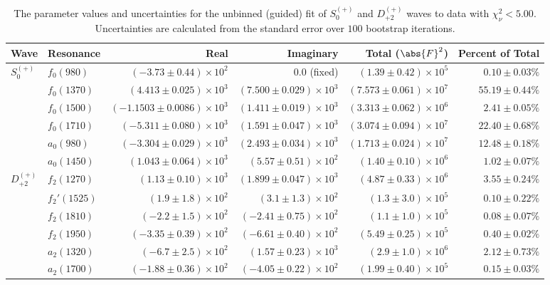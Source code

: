 \begin{table}[ht]
    \begin{center}
        \begin{tabular}{llrrrr}\toprule
        Wave & Resonance & Real & Imaginary & Total ($\abs{F}^2$) & Percent of Total \\\midrule
$S_{0}^{(+)}$ & $f_{0}(980)$ & $(-3.73 \pm 0.44) \times 10^{2}$ & $0.0$ (fixed) & $(1.39 \pm 0.42) \times 10^{5}$ & $0.10 \pm 0.03 \%$ \\
 & $f_{0}(1370)$ & $(4.413 \pm 0.025) \times 10^{3}$ & $(7.500 \pm 0.029) \times 10^{3}$ & $(7.573 \pm 0.061) \times 10^{7}$ & $55.19 \pm 0.44 \%$ \\
 & $f_{0}(1500)$ & $(-1.1503 \pm 0.0086) \times 10^{3}$ & $(1.411 \pm 0.019) \times 10^{3}$ & $(3.313 \pm 0.062) \times 10^{6}$ & $2.41 \pm 0.05 \%$ \\
 & $f_{0}(1710)$ & $(-5.311 \pm 0.080) \times 10^{3}$ & $(1.591 \pm 0.047) \times 10^{3}$ & $(3.074 \pm 0.094) \times 10^{7}$ & $22.40 \pm 0.68 \%$ \\
 & $a_{0}(980)$ & $(-3.304 \pm 0.029) \times 10^{3}$ & $(2.493 \pm 0.034) \times 10^{3}$ & $(1.713 \pm 0.024) \times 10^{7}$ & $12.48 \pm 0.18 \%$ \\
 & $a_{0}(1450)$ & $(1.043 \pm 0.064) \times 10^{3}$ & $(5.57 \pm 0.51) \times 10^{2}$ & $(1.40 \pm 0.10) \times 10^{6}$ & $1.02 \pm 0.07 \%$ \\
$D_{+2}^{(+)}$ & $f_{2}(1270)$ & $(1.13 \pm 0.10) \times 10^{3}$ & $(1.899 \pm 0.047) \times 10^{3}$ & $(4.87 \pm 0.33) \times 10^{6}$ & $3.55 \pm 0.24 \%$ \\
 & $f_{2}'(1525)$ & $(1.9 \pm 1.8) \times 10^{2}$ & $(3.1 \pm 1.3) \times 10^{2}$ & $(1.3 \pm 3.0) \times 10^{5}$ & $0.10 \pm 0.22 \%$ \\
 & $f_{2}(1810)$ & $(-2.2 \pm 1.5) \times 10^{2}$ & $(-2.41 \pm 0.75) \times 10^{2}$ & $(1.1 \pm 1.0) \times 10^{5}$ & $0.08 \pm 0.07 \%$ \\
 & $f_{2}(1950)$ & $(-3.35 \pm 0.39) \times 10^{2}$ & $(-6.61 \pm 0.40) \times 10^{2}$ & $(5.49 \pm 0.25) \times 10^{5}$ & $0.40 \pm 0.02 \%$ \\
 & $a_{2}(1320)$ & $(-6.7 \pm 2.5) \times 10^{2}$ & $(1.57 \pm 0.23) \times 10^{3}$ & $(2.9 \pm 1.0) \times 10^{6}$ & $2.12 \pm 0.73 \%$ \\
 & $a_{2}(1700)$ & $(-1.88 \pm 0.36) \times 10^{2}$ & $(-4.05 \pm 0.22) \times 10^{2}$ & $(1.99 \pm 0.40) \times 10^{5}$ & $0.15 \pm 0.03 \%$ \\\bottomrule
        \end{tabular}
    \caption{The parameter values and uncertainties for the unbinned (guided) fit of $S_{0}^{(+)}$ and $D_{+2}^{(+)}$ waves to data with $\chi^2_\nu < 5.00$. Uncertainties are calculated from the standard error over $100$ bootstrap iterations.}\label{tab:unbinned-fit-chisqdof-5.0-guided-Sp0p-Dp2p}
    \end{center}
\end{table}
